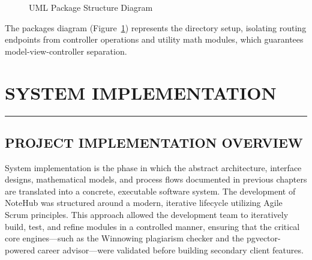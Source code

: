 \documentclass[12,Times new Roman,a4paper]{report}
\begin{document}
\begin{figure}[H]
\centering
{}
\caption{UML Package Structure Diagram}
\label{fig:package_diagram}
\end{figure}

The packages diagram (Figure~\ref{fig:package_diagram}) represents the directory setup, isolating routing endpoints from controller operations and utility math modules, which guarantees model-view-controller separation.
\chapter{SYSTEM IMPLEMENTATION}
\rule{\textwidth}{1pt}
\paragraph{}
\section{PROJECT IMPLEMENTATION OVERVIEW}

System implementation is the phase in which the abstract architecture, interface designs, mathematical models, and process flows documented in previous chapters are translated into a concrete, executable software system. The development of NoteHub was structured around a modern, iterative lifecycle utilizing Agile Scrum principles. This approach allowed the development team to iteratively build, test, and refine modules in a controlled manner, ensuring that the critical core engines---such as the Winnowing plagiarism checker and the pgvector-powered career advisor---were validated before building secondary client features.
\end{document}
